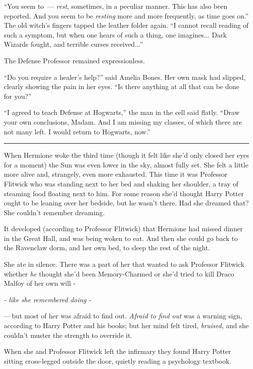 ``You seem to~--- \emph{rest}, sometimes, in a peculiar manner. This has also been reported. And you seem to be \emph{resting} more and more frequently, as time goes on.'' The old witch's fingers tapped the leather folder again. ``I cannot recall reading of such a symptom, but when one hears of such a thing, one imagines... Dark Wizards fought, and terrible curses received...''

The Defense Professor remained expressionless.

``Do you require a healer's help?'' said Amelia Bones. Her own mask had slipped, clearly showing the pain in her eyes. ``Is there anything at all that can be done for you?''

``I agreed to teach Defense at Hogwarts,'' the man in the cell said flatly. ``Draw your own conclusions, Madam. And I am missing my classes, of which there are not many left. I would return to Hogwarts, now.''

\begin{center}\rule{3in}{0.4pt}\end{center}

When Hermione woke the third time (though it felt like she'd only closed her eyes for a moment) the Sun was even lower in the sky, almost fully set. She felt a little more alive and, strangely, even more exhausted. This time it was Professor Flitwick who was standing next to her bed and shaking her shoulder, a tray of steaming food floating next to him. For some reason she'd thought Harry Potter ought to be leaning over her bedside, but he wasn't there. Had she dreamed that? She couldn't remember dreaming.

It developed (according to Professor Flitwick) that Hermione had missed dinner in the Great Hall, and was being woken to eat. And then she could go back to the Ravenclaw dorm, and her own bed, to sleep the rest of the night.

She ate in silence. There was a part of her that wanted to ask Professor Flitwick whether \emph{he} thought she'd been Memory-Charmed or she'd tried to kill Draco Malfoy of her own will -

\emph{- like she remembered doing -}

---\,but most of her was afraid to find out. \emph{Afraid to find out} was a warning sign, according to Harry Potter and his books; but her mind felt tired, \emph{bruised,} and she couldn't muster the strength to override it.

When she and Professor Flitwick left the infirmary they found Harry Potter sitting cross-legged outside the door, quietly reading a psychology textbook.

